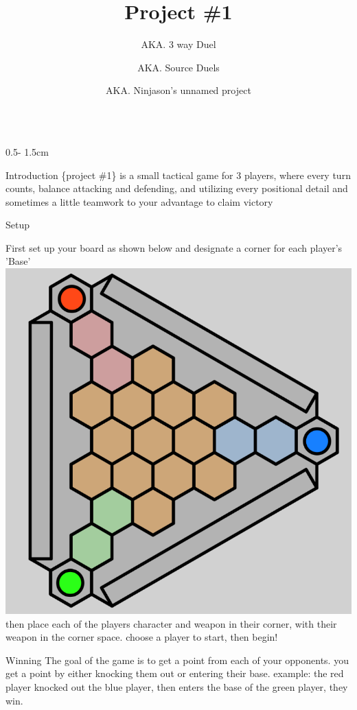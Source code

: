 \documentclass{uioposter}
\title{Project \#1}
\author
{%
    AKA. 3 way Duel
    \and
    AKA. Source Duels
    \and
    AKA. Ninjason's unnamed project
}
\institute
{
    3 Players
    \and
    5-10 minutes
    \and
    ages 10?+ idk
}
\begin{document}
\begin{frame}
\begin{columns}[onlytextwidth]


\begin{column}{0.5\textwidth - 1.5cm}

    \begin{block}{Introduction}
        \{project \#1\} is a small tactical game for 3 players, where every turn counts, balance attacking and defending, and utilizing every positional detail and sometimes a little teamwork to your advantage to claim victory
    \end{block}

    \begin{block}{Setup}
        \raggedright
        First set up your board as shown below and designate a corner for each player's 'Base'
        \includegraphics[]{Img/3DuelBoard.png}
        \newline
        then place each of the players character and weapon in their corner, with their weapon in the corner space. choose a player to start, then begin!
    \end{block}

    \begin{block}{Winning}
        The goal of the game is to get a point from each of your opponents. you get a point by either knocking them out or entering their base.
        \newline
        example: the red player knocked out the blue player, then enters the base of the green player, they win.
    \end{block}



\end{column}
\end{columns}
\end{frame}
\end{document}
